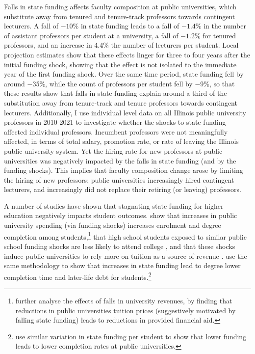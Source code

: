 Falls in state funding affects faculty composition at public universities, which substitute away from tenured and tenure-track professors towards contingent lecturers.
A fall of $-10$\% in state funding leads to a fall of $-1.4$\% in the number of assistant professors per student at a university, a fall of $-1.2$\% for tenured professors, and an increase in 4.4\% the number of lecturers per student.
Local projection estimates show that these effects linger for three to four years after the initial funding shock, showing that the effect is not isolated to the immediate year of the first funding shock. 
Over the same time period, state funding fell by around $-$35\%, while the count of professors per student fell by $-$9\%, so that these results show that falls in state funding explain around a third of the substitution away from tenure-track and tenure professors towards contingent lecturers.
Additionally, I use individual level data on all Illinois public university professors in 2010-2021 to investigate whether the shocks to state funding affected individual professors.
Incumbent professors were not meaningfully affected, in terms of total salary, promotion rate, or rate of leaving the Illinois public university system.
Yet the hiring rate for new professors at public universities was negatively impacted by the falls in state funding (and by the funding shocks).
This implies that faculty composition change arose by limiting the hiring of new professors; public universities increasingly hired contingent lecturers, and increasingly did not replace their retiring (or leaving) professors.

A number of studies have shown that stagnating state funding for higher education negatively impacts student outcomes.
\cite{NBERw23736} show that increases in public university spending (via funding shocks) increases enrolment and degree completion among students,\footnote{
    \cite{miller2022making} further analyse the effects of falls in university revenues, by finding that reductions in public universities tuition prices (suggestively motivated by falling state funding) leads to reductions in provided financial aid.
}
that high school students exposed to similar public school funding shocks are less likely to attend college \citep{jackson2021school}, and that these shocks induce public universities to rely more on tuition as a source of revenue \citep{bound2019public}.
\cite{NBERw27885} use the same methodology to show that increases in state funding lead to degree lower completion time and later-life debt for students.\footnote{
    \cite{bound2007cohort} use similar variation in state funding per student to show that lower funding leads to lower completion rates at public universities.
}

